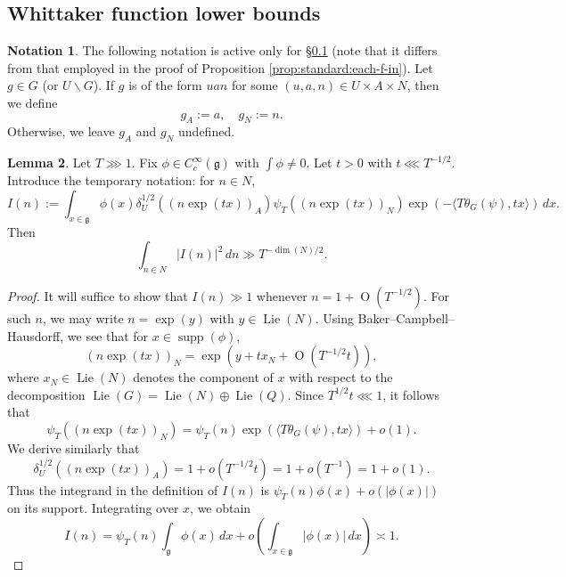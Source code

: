 \documentclass[reqno]{amsart}
\DeclareMathOperator{\Lie}{Lie}
\def\O{\operatorname{O}}
\DeclareMathOperator{\supp}{supp}
\theoremstyle{plain} \newtheorem{theorem} {Theorem}
\theoremstyle{definition} \newtheorem{definition} [theorem] {Definition}
\newtheorem{notation} [theorem]        {Notation}
\theoremstyle{itplain} %
\newtheorem{lemma}[theorem]{Lemma}
\numberwithin{equation}{section}
\numberwithin{theorem}{section}
\begin{document}
\subsection{Whittaker function lower bounds}\label{sec:whitt-funct-lower}

\begin{notation}
  The following notation is active only for \S\ref{sec:whitt-funct-lower} (note that it differs from that employed in the proof of Proposition \ref{prop:standard:each-f-in}).  Let $g \in G$ (or $U \backslash G$).  If $g$ is of the form $u a n$ for some $(u,a,n) \in U \times A \times N$, then we define
  \begin{equation*}
    g_A := a,
    \quad
    g_N := n.
  \end{equation*}
  Otherwise, we leave $g_A$ and $g_N$ undefined.
\end{notation}


\begin{lemma}
  Let $T \ggg 1$.  Fix $\phi \in C_c^\infty(\mathfrak{g})$ with $\int \phi \neq 0$.  Let $t > 0$ with $t \lll T^{-1/2}$.  Introduce the temporary notation: for $n \in N$,
  \begin{equation*}
    I(n) := 
    \int _{x \in \mathfrak{g}}
    \phi(x) \delta_U^{1/2}((n \exp(t x))_A)
    \psi_T ( (n \exp(t x))_N)
    \exp (- \langle T \theta_G(\psi), t x \rangle) \, d x.
  \end{equation*}
  Then
  \begin{equation*}
    \int _{n \in N}
    \left\lvert
      I(n)
    \right\rvert^2
    \, d n
    \gg T^{-\dim(N)/2}.
  \end{equation*}
\end{lemma}
\begin{proof}
  It will suffice to show that $I(n) \gg 1$ whenever $n = 1 + \O(T^{-1/2})$.  For such $n$, we may write $n = \exp(y)$ with $y \in \Lie(N)$.  Using Baker--Campbell--Hausdorff, we see that for $x \in \supp(\phi)$,
  \begin{equation*}
(n \exp(tx))_N = \exp(y + t x_N + \O(T^{-1/2} t)),
\end{equation*}
where $x_N \in \Lie(N)$ denotes the component of $x$ with respect to the decomposition $\Lie(G) = \Lie(N) \oplus \Lie(Q)$.  Since $T^{1/2} t \lll 1$, it follows that
\begin{equation*}
\psi_T((n \exp(t x))_N) = \psi_T(n) \exp (\langle T \theta_G(\psi), t x \rangle) + o(1).
\end{equation*}
 We derive similarly that
\begin{equation*}
\delta_U^{1/2}((n \exp(t x))_A) = 1 + o(T^{-1/2} t) = 1 + o(T^{-1}) = 1 + o(1).
\end{equation*}
Thus the integrand in the definition of $I(n)$ is $\psi_T(n) \phi(x) + o(|\phi(x)|)$ on its support.  Integrating over $x$, we obtain
\begin{equation*}
  I(n) = \psi_T(n) \int _{\mathfrak{g} } \phi(x) \, d x + o( \int _{x \in \mathfrak{g} } |\phi(x)| \, d x)
  \asymp 1.
\end{equation*}
\end{proof}
\end{document}
